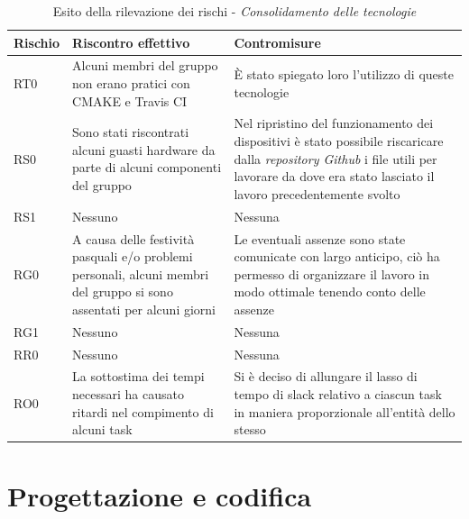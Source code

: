 \documentclass[./PianodiProgetto.tex]{subfiles}
\begin{document}
\begin{longtable}{|p{15mm}|p{60mm}|p{60mm}|}
	\caption{Esito della rilevazione dei rischi - \textit{Consolidamento delle tecnologie}} \\
	\hline \textbf{Rischio} & \textbf{Riscontro effettivo} & \textbf{Contromisure} \\
	
	\hline RT0 & Alcuni membri del gruppo non erano pratici con CMAKE e Travis CI &  È stato spiegato loro l'utilizzo di queste tecnologie \\
	
	\hline RS0 & Sono stati riscontrati alcuni guasti hardware da parte di alcuni componenti del gruppo & Nel ripristino del funzionamento dei dispositivi è stato possibile riscaricare dalla \textit{repository Github} i file utili per lavorare da dove era stato lasciato il lavoro precedentemente svolto \\
	
	\hline RS1 & Nessuno & Nessuna \\
	
	\hline RG0 & A causa delle festività pasquali e/o problemi personali, alcuni membri del gruppo si sono assentati per alcuni giorni & Le eventuali assenze sono state comunicate con largo anticipo, ciò ha permesso di organizzare il lavoro in modo ottimale tenendo conto delle assenze \\
	
	\hline RG1 & Nessuno & Nessuna \\
	
	\hline RR0 & Nessuno & Nessuna \\
	
	\hline RO0 & La sottostima dei tempi necessari ha causato ritardi nel compimento di alcuni task & Si è deciso di allungare il lasso di tempo di slack relativo a ciascun task in maniera proporzionale all'entità dello stesso \\
	
	\hline
\end{longtable}

\section{Progettazione e codifica}

\setlength\LTleft{-5.5mm}
\end{document}
